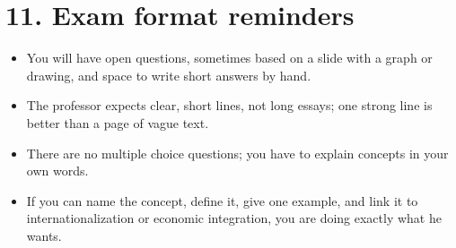 \documentclass[10pt,a4paper]{article}
\begin{document}
\section*{11. Exam format reminders}
\begin{itemize}
\item You will have open questions, sometimes based on a slide with a graph or drawing, and space to write short answers by hand.
\item The professor expects clear, short lines, not long essays; one strong line is better than a page of vague text.
\item There are no multiple choice questions; you have to explain concepts in your own words.
\item If you can name the concept, define it, give one example, and link it to internationalization or economic integration, you are doing exactly what he wants.
\end{itemize}
\end{document}
